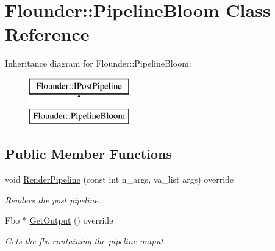 \hypertarget{class_flounder_1_1_pipeline_bloom}{}\section{Flounder\+:\+:Pipeline\+Bloom Class Reference}
\label{class_flounder_1_1_pipeline_bloom}
Inheritance diagram for Flounder\+:\+:Pipeline\+Bloom\+:\begin{figure}[H]
\begin{center}
\leavevmode
\includegraphics[height=2.000000cm]{class_flounder_1_1_pipeline_bloom}
\end{center}
\end{figure}
\subsection*{Public Member Functions}
\begin{DoxyCompactItemize}
\item 
void \hyperlink{class_flounder_1_1_pipeline_bloom_a2bff537e219a74540c1bda4c31fb4354}{Render\+Pipeline} (const int n\+\_\+args, va\+\_\+list args) override
\begin{DoxyCompactList}\small\item\em Renders the post pipeline. \end{DoxyCompactList}\item 
Fbo $\ast$ \hyperlink{class_flounder_1_1_pipeline_bloom_af1ee24a22c9c28e3f9a66df542a943ee}{Get\+Output} () override
\begin{DoxyCompactList}\small\item\em Gets the fbo containing the pipeline output. \end{DoxyCompactList}\end{DoxyCompactItemize}
